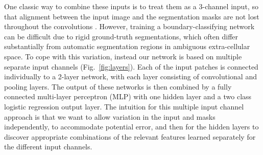 One classic way to combine these inputs is to treat them as a 3-channel input, so that alignment between the input image and the segmentation masks are not lost throughout the convolutions \cite{??} . However, training a boundary-classifying network can be difficult due to rigid ground-truth segmentations, which often differ substantially from automatic segmentation regions in ambiguous extra-cellular space. To cope with this variation, instead our network is based on multiple separate input channels (Fig.~\ref{fig:layers}). Each of the input patches is connected individually to a 2-layer network, with each layer consisting of convolutional and pooling layers. The output of these networks is then combined by a fully connected multi-layer perceptron (MLP) with one hidden layer and a two class logistic regression output layer. The intuition for this multiple input channel approach is that we want to allow variation in the input and masks independently, to accommodate potential error, and then for the hidden layers to discover appropriate combinations of the relevant features learned separately for the different input channels.


